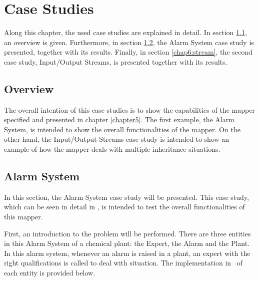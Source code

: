 \chapter{Case Studies}
\label{chapter6}

Along this chapter, the used case studies are explained in detail. In section \ref{chap6:overview}, an overview is given. Furthermore, in section \ref{chap6:alarm}, the Alarm System case study is presented, together with its results. Finally, in section \ref{chap6:stream}, the second case study, Input/Output Streams, is presented together with its results.

\section{Overview}
\label{chap6:overview}
The overall intention of this case studies is to show the capabilities of the mapper specified and presented in chapter \ref{chapter5}. The first example, the Alarm System, is intended to show the overall functionalities of the mapper. On the other hand, the Input/Output Streams case study is intended to show an example of how the mapper deals with multiple inheritance situations.


\section{Alarm System}
\label{chap6:alarm}

In this section, the Alarm System case study will be presented. This case study, which can be seen in detail in \cite{Fitzgerald&05}, is intended to test the overall functionalities of this mapper.

First, an introduction to the problem will be performed. There are three entities in this Alarm System of a chemical plant: the Expert, the Alarm and the Plant. In this alarm system, whenever an alarm is raised in a plant, an expert with the right qualifications is called to deal with situation. The implementation in \vpp\ of each entity is provided below.

